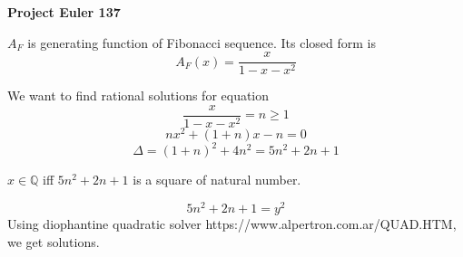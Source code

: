 \documentclass[a4paper,12pt]{article}
\begin{document}
\setlength\parindent{0pt}
\textbf{Project Euler 137}
\vspace{5ex}

\(A_F\) is generating function of Fibonacci sequence. Its closed form is \[A_F(x) = \frac{x}{1 - x - x^2}\]

We want to find rational solutions for equation \[\frac{x}{1-x-x^2} = n \geq 1\]
\[nx^2 + (1 + n)x - n = 0\]
\[\Delta = (1 + n)^2 + 4n^2 = 5n^2 + 2n + 1\]

\(x \in \mathbb{Q}\) iff \(5n^2 + 2n + 1\) is a square of natural number.

\[5n^2 + 2n + 1 = y^2\]
Using diophantine quadratic solver https://www.alpertron.com.ar/QUAD.HTM, we get solutions.
\end{document}
